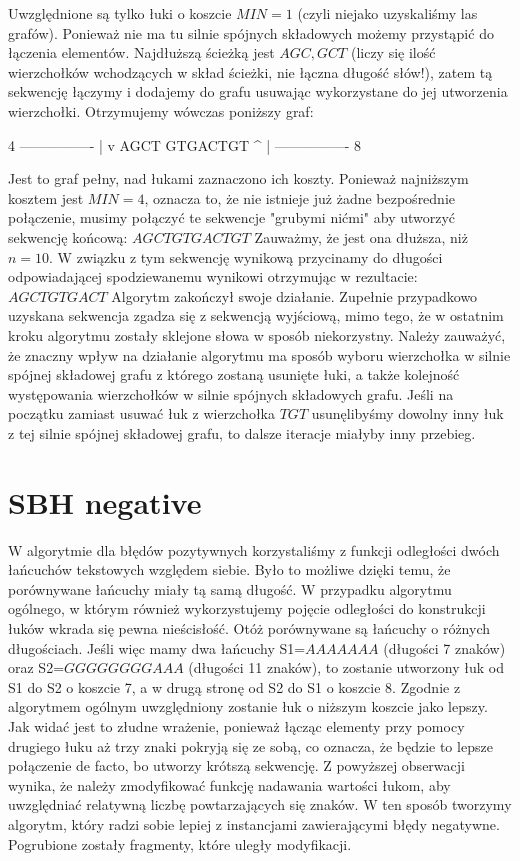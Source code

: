 \documentclass[a4paper]{article}
\begin{document}
Uwzględnione są tylko łuki o koszcie $MIN=1$ (czyli niejako uzyskaliśmy las grafów). Ponieważ nie ma tu silnie spójnych składowych możemy przystąpić do łączenia elementów. Najdłuższą ścieżką jest $AGC, GCT$ (liczy się ilość wierzchołków wchodzących w skład ścieżki, nie łączna długość słów!), zatem tą sekwencję łączymy i dodajemy do grafu usuwając wykorzystane do jej utworzenia wierzchołki.
Otrzymujemy wówczas poniższy graf:

         4
  ----------------
  |              v
AGCT          GTGACTGT
  ^              |
  ----------------
         8
		 
Jest to graf pełny, nad łukami zaznaczono ich koszty. Ponieważ najniższym kosztem jest $MIN=4$, oznacza to, że nie istnieje już żadne bezpośrednie połączenie, musimy połączyć te sekwencje "grubymi nićmi" aby utworzyć sekwencję końcową:
$AGCTGTGACTGT$
Zauważmy, że jest ona dłuższa, niż $n=10$. W związku z tym sekwencję wynikową przycinamy do długości odpowiadającej spodziewanemu wynikowi otrzymując w rezultacie:
$AGCTGTGACT$
Algorytm zakończył swoje działanie. Zupełnie przypadkowo uzyskana sekwencja zgadza się z sekwencją wyjściową, mimo tego, że w ostatnim kroku algorytmu zostały sklejone słowa w sposób niekorzystny.
Należy zauważyć, że znaczny wpływ na działanie algorytmu ma sposób wyboru wierzchołka w silnie spójnej składowej grafu z którego zostaną usunięte łuki, a także kolejność występowania wierzchołków w silnie spójnych składowych grafu. Jeśli na początku zamiast usuwać łuk z wierzchołka $TGT$ usunęlibyśmy dowolny inny łuk z tej silnie spójnej składowej grafu, to dalsze iteracje miałyby inny przebieg.

\section{SBH negative}
W algorytmie dla błędów pozytywnych korzystaliśmy z funkcji odległości dwóch łańcuchów tekstowych względem siebie. Było to możliwe dzięki temu, że porównywane łańcuchy miały tą samą długość. W przypadku algorytmu ogólnego, w którym również wykorzystujemy pojęcie odległości do konstrukcji łuków wkrada się pewna nieścisłość. Otóż porównywane są łańcuchy o różnych długościach. Jeśli więc mamy dwa łańcuchy S1=$AAAAAAA$ (długości 7 znaków) oraz S2=$GGGGGGGGAAA$ (długości 11 znaków), to zostanie utworzony łuk od S1 do S2 o koszcie 7, a w drugą stronę od S2 do S1 o koszcie 8. Zgodnie z algorytmem ogólnym uwzględniony zostanie łuk o niższym koszcie jako lepszy. Jak widać jest to złudne wrażenie, ponieważ łącząc elementy przy pomocy drugiego łuku aż trzy znaki pokryją się ze sobą, co oznacza, że będzie to lepsze połączenie de facto, bo utworzy krótszą sekwencję.
Z powyższej obserwacji wynika, że należy zmodyfikować funkcję nadawania wartości łukom, aby uwzględniać relatywną liczbę powtarzających się znaków. W ten sposób tworzymy algorytm, który radzi sobie lepiej z instancjami zawierającymi błędy negatywne. Pogrubione zostały fragmenty, które uległy modyfikacji.
\end{document}
